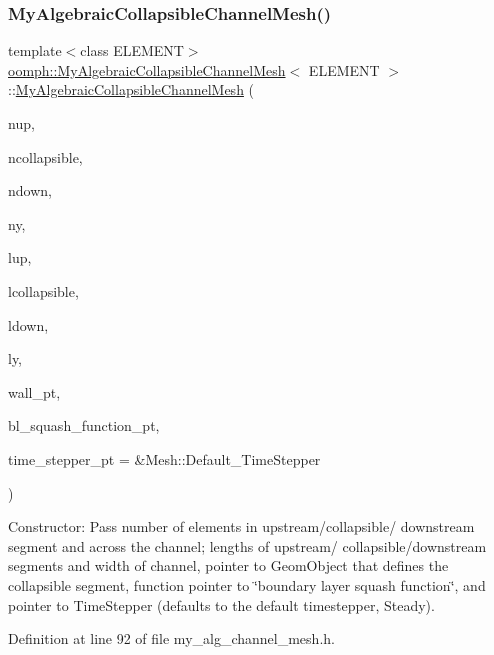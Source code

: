 \subsubsection{\texorpdfstring{My\+Algebraic\+Collapsible\+Channel\+Mesh()}{MyAlgebraicCollapsibleChannelMesh()}\hspace{0.1cm}{\footnotesize\ttfamily [2/2]}}
{\footnotesize\ttfamily template$<$class E\+L\+E\+M\+E\+NT$>$ \\
\hyperlink{classoomph_1_1MyAlgebraicCollapsibleChannelMesh}{oomph\+::\+My\+Algebraic\+Collapsible\+Channel\+Mesh}$<$ E\+L\+E\+M\+E\+NT $>$\+::\hyperlink{classoomph_1_1MyAlgebraicCollapsibleChannelMesh}{My\+Algebraic\+Collapsible\+Channel\+Mesh} (\begin{DoxyParamCaption}\item[{const unsigned \&}]{nup,  }\item[{const unsigned \&}]{ncollapsible,  }\item[{const unsigned \&}]{ndown,  }\item[{const unsigned \&}]{ny,  }\item[{const double \&}]{lup,  }\item[{const double \&}]{lcollapsible,  }\item[{const double \&}]{ldown,  }\item[{const double \&}]{ly,  }\item[{Geom\+Object $\ast$}]{wall\+\_\+pt,  }\item[{Collapsible\+Channel\+Domain\+::\+B\+L\+Squash\+Fct\+Pt}]{bl\+\_\+squash\+\_\+function\+\_\+pt,  }\item[{Time\+Stepper $\ast$}]{time\+\_\+stepper\+\_\+pt = {\ttfamily \&Mesh\+:\+:Default\+\_\+TimeStepper} }\end{DoxyParamCaption})\hspace{0.3cm}{\ttfamily [inline]}}



Constructor\+: Pass number of elements in upstream/collapsible/ downstream segment and across the channel; lengths of upstream/ collapsible/downstream segments and width of channel, pointer to Geom\+Object that defines the collapsible segment, function pointer to \char`\"{}boundary layer squash function\char`\"{}, and pointer to Time\+Stepper (defaults to the default timestepper, Steady). 



Definition at line 92 of file my\+\_\+alg\+\_\+channel\+\_\+mesh.\+h.



